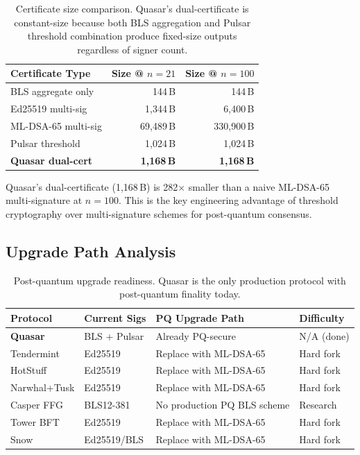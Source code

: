 \begin{table}[h]
\centering
\begin{tabular}{@{}lrr@{}}
\toprule
\textbf{Certificate Type} & \textbf{Size @ $n=21$} & \textbf{Size @ $n=100$} \\
\midrule
BLS aggregate only         & 144\,B               & 144\,B \\
Ed25519 multi-sig          & 1{,}344\,B           & 6{,}400\,B \\
ML-DSA-65 multi-sig        & 69{,}489\,B          & 330{,}900\,B \\
Pulsar threshold         & 1{,}024\,B           & 1{,}024\,B \\
\textbf{Quasar dual-cert}  & \textbf{1{,}168\,B}  & \textbf{1{,}168\,B} \\
\bottomrule
\end{tabular}
\caption{Certificate size comparison. Quasar's dual-certificate is constant-size
because both BLS aggregation and Pulsar threshold combination produce fixed-size
outputs regardless of signer count.}
\label{tab:cert-size}
\end{table}

Quasar's dual-certificate (1{,}168\,B) is 282$\times$ smaller than a naive ML-DSA-65
multi-signature at $n=100$. This is the key engineering advantage of threshold
cryptography over multi-signature schemes for post-quantum consensus.

\subsection{Upgrade Path Analysis}

\begin{table}[h]
\centering
\small
\begin{tabular}{@{}llll@{}}
\toprule
\textbf{Protocol} & \textbf{Current Sigs} & \textbf{PQ Upgrade Path} & \textbf{Difficulty} \\
\midrule
\textbf{Quasar}   & BLS + Pulsar & Already PQ-secure           & N/A (done) \\
Tendermint        & Ed25519        & Replace with ML-DSA-65       & Hard fork \\
HotStuff          & Ed25519        & Replace with ML-DSA-65       & Hard fork \\
Narwhal+Tusk      & Ed25519        & Replace with ML-DSA-65       & Hard fork \\
Casper FFG        & BLS12-381      & No production PQ BLS scheme  & Research \\
Tower BFT         & Ed25519        & Replace with ML-DSA-65       & Hard fork \\
Snow              & Ed25519/BLS    & Replace with ML-DSA-65       & Hard fork \\
\bottomrule
\end{tabular}
\caption{Post-quantum upgrade readiness. Quasar is the only production protocol with
post-quantum finality today.}
\label{tab:pq-readiness}
\end{table}

